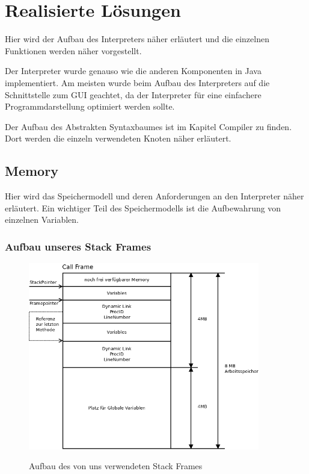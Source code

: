 \section{Realisierte Lösungen}
Hier wird der Aufbau des Interpreters näher erläutert und die einzelnen Funktionen werden näher vorgestellt.

Der Interpreter wurde genauso wie die anderen Komponenten in Java implementiert.
Am meisten wurde beim Aufbau des Interpreters auf die Schnittstelle zum GUI geachtet, da der Interpreter für eine einfachere
Programmdarstellung optimiert werden sollte.

Der Aufbau des Abstrakten Syntaxbaumes ist im Kapitel Compiler zu finden. Dort werden die einzeln verwendeten 
Knoten näher erläutert.

\subsection{Memory}
Hier wird das Speichermodell und deren Anforderungen an den Interpreter näher erläutert.
Ein wichtiger Teil des Speichermodells ist die Aufbewahrung von einzelnen Variablen.

\subsubsection{Aufbau unseres Stack Frames}
\begin{figure}[Stack Frame]
\begin{center}
\includegraphics[width=0.9\textwidth]{./media/images/interpreter/memory/stackframe.png}
\label{stackframe1} 
\caption{Aufbau des von uns verwendeten Stack Frames}
\end{center}
\end{figure}

